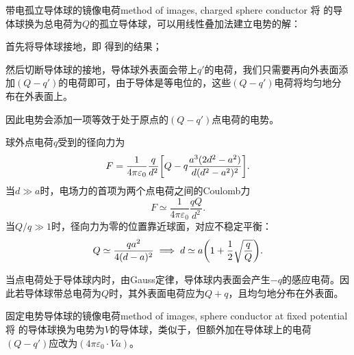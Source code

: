 \begin{example}{带电孤立导体球的镜像电荷}{method of images, charged sphere conductor}
    将 的导体球换为总电荷为$Q$的孤立导体球，可以用线性叠加法建立电势的解：
    \begin{compactenum}
        \item 首先将导体球接地，即 得到的结果；
        \item 然后切断导体球的接地，导体球外表面会带上$q'$的电荷，我们只需要再向外表面添加$(Q - q')$的电荷即可，由于导体是等电位的，这些$(Q - q')$电荷将均匀地分布在外表面上。
    \end{compactenum}
    因此电势会添加一项等效于处于原点的$(Q - q')$点电荷的电势。
    
    球外点电荷$q$受到的径向力为
    \begin{equation}
        F = \frac1{4\pi\varepsilon_0}\frac q{d^2}\biggl[Q - q\frac{a^3(2d^2 - a^2)}{d(d^2 - a^2)^2}\biggr].
    \end{equation}
    当$d \gg a$时，电场力的首项为两个点电荷之间的Coulomb力
    \[
        F \simeq \frac1{4\pi\varepsilon_0}\frac{qQ}{d^2}.
    \]
    当$Q/q \gg 1$时，径向力为零的位置靠近球面，对应不稳定平衡：
    \begin{equation}
        Q \simeq \frac{qa^2}{4(d - a)^2} \implies d \simeq a\biggl(1 + \frac12\sqrt{\frac qQ}\biggr).
    \end{equation}
\end{example}
\begin{remark}
    当点电荷处于导体球内时，由Gauss定律，导体球内表面会产生$-q$的感应电荷。因此若导体球带总电荷为$Q$时，其外表面电荷应为$Q + q$，且均匀地分布在外表面。
\end{remark}
\begin{example}{固定电势导体球的镜像电荷}{method of images, sphere conductor at fixed potential}
    将 的导体球换为电势为$V$的导体球，类似于，但额外加在导体球上的电荷$(Q - q')$应改为$(4\pi\varepsilon_0 \cdot Va)$。
\end{example}

